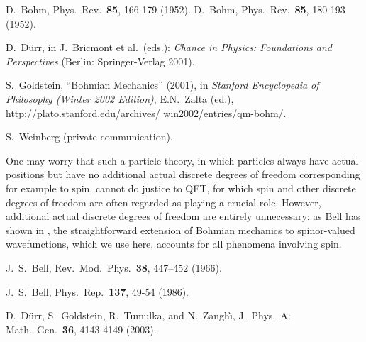 \documentclass[12pt, showpacs, superscriptaddress]{revtex4-2}%
\begin{document}
\begin{thebibliography}{28.}


 D.~Bohm,
   Phys.\ Rev.\ \textbf{85}, 166-179 (1952).  D.~Bohm,
   Phys.\ Rev.\ \textbf{85}, 180-193 (1952).

 D.~D\"urr, %
   in J.~Bricmont et
   al.\ (eds.): \textit{Chance in Physics: Foundations and
   Perspectives}  (Berlin: Springer-Verlag 2001).

 S.~Goldstein, ``Bohmian Mechanics'' (2001), in
   \textit{Stanford Encyclopedia of Philosophy (Winter 2002 Edition)},
   E.N.~Zalta (ed.),
   http://plato.stanford.edu/archives/ win2002/entries/qm-bohm/.

 S.~Weinberg (private communication).

 One may worry that such a particle theory, in which
particles always have actual positions but have no additional actual
discrete degrees of freedom corresponding for example to spin, cannot
do justice to QFT, for which spin and other discrete degrees of
freedom are often regarded as playing a crucial role. However,
additional actual discrete degrees of freedom are entirely
unnecessary: as Bell has shown in \cite{1966}, the straightforward
extension of Bohmian mechanics to spinor-valued wavefunctions, which
we use here, accounts for all phenomena involving spin.

 J.~S.~Bell,
    Rev.\ Mod.\ Phys.\ \textbf{38}, 447--452 (1966).

 J.~S.~Bell,
   Phys.\ Rep.\ \textbf{137}, 49-54 (1986).

 D.~D\"urr, S.~Goldstein, R.~Tumulka, and N.~Zangh{\`\i},
   J.\ Phys.\ A: Math.\ Gen.\ \textbf{36},
   4143-4149 (2003). %


\end{thebibliography}
\end{document}
